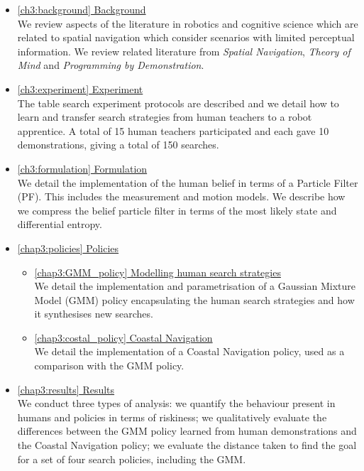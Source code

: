 \begin{itemize}

\item  \hyperref[ch3:background]{\ref{ch3:background}   Background}\\
We review aspects of the literature in robotics and cognitive science which are related to spatial navigation which 
consider scenarios with limited perceptual information. We review related literature from \textit{Spatial Navigation}, 
\textit{Theory of Mind} and \textit{Programming by Demonstration}.

\item  \hyperref[ch3:experiment]{\ref{ch3:experiment}   Experiment}\\
The table search experiment protocols are described and we detail how to learn and transfer search strategies from human teachers to a robot 
apprentice. A total of 15 human teachers participated and each gave 10 demonstrations, giving a total of 150 searches.

\item  \hyperref[ch3:formulation]{\ref{ch3:formulation}  Formulation}\\
We detail the implementation of the human belief in terms of a Particle Filter (PF). This includes the measurement and motion 
models. We describe how we compress the belief particle filter in terms of the most likely state and differential entropy.

\item  \hyperref[chap3:policies]{\ref{chap3:policies} 	Policies}
\begin{itemize}
  \item \hyperref[chap3:GMM_policy]{\ref{chap3:GMM_policy} Modelling human search strategies}\\
  We detail the implementation and parametrisation of a Gaussian Mixture Model (GMM) policy encapsulating
the human search strategies and how it synthesises new searches.
  \item \hyperref[chap3:costal_policy]{\ref{chap3:costal_policy} Coastal Navigation}\\
  We detail the implementation of a Coastal Navigation policy, used as a comparison with the GMM policy.
\end{itemize}

\item  \hyperref[chap3:results]{\ref{chap3:results} 	Results}\\
We conduct three types of analysis: we quantify the behaviour present in humans and policies in terms of riskiness; we 
qualitatively evaluate the differences between the GMM policy learned from human demonstrations and the Coastal Navigation policy;
we evaluate the distance taken to find the goal for a set of four search policies, including the GMM.

\end{itemize}

